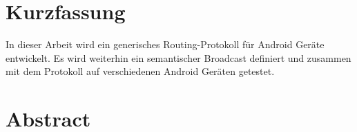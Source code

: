 \setcounter{page}{1}
\onehalfspacing
{}
\section{Kurzfassung}
In dieser Arbeit wird ein generisches Routing-Protokoll für Android Geräte entwickelt. Es wird weiterhin ein semantischer Broadcast definiert und zusammen mit dem Protokoll auf verschiedenen Android Geräten getestet. 
\vspace{-1em}
\section*{Abstract}



